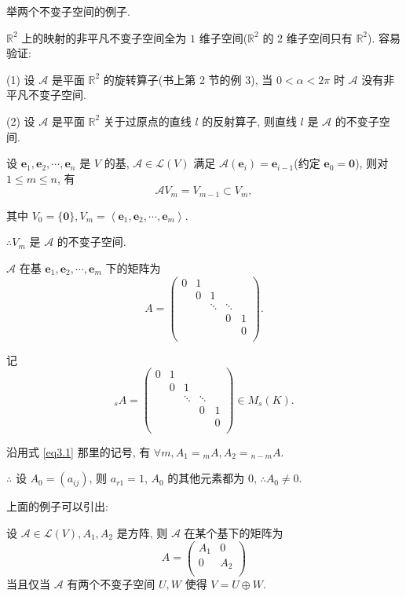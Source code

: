 \documentclass{ctexart}
\begin{document}
举两个不变子空间的例子.
\begin{example}
    $\mathbb{R}^2$ 上的映射的非平凡不变子空间全为 $1$ 维子空间($\mathbb{R}^2$ 的 $2$ 维子空间只有 $\mathbb{R}^2$). 容易验证:
    
    (1) 设 $\mathcal{A}$ 是平面 $\mathbb{R}^2$ 的旋转算子(书上第 2 节的例 3), 当 $0<\alpha<2\pi$ 时 $\mathcal{A}$ 没有非平凡不变子空间.

    (2) 设 $\mathcal{A}$ 是平面 $\mathbb{R}^2$ 关于过原点的直线 $l$ 的反射算子, 则直线 $l$ 是 $\mathcal{A}$ 的不变子空间.
\end{example}
\begin{example}\label{exa3.2}
    设 $\boldsymbol{e}_1,\boldsymbol{e}_2,\cdots,\boldsymbol{e}_n$ 是 $V$ 的基, $\mathcal{A}\in\mathcal{L}(V)$ 满足 $\mathcal{A}(\boldsymbol{e}_i)=\boldsymbol{e}_{i-1}$(约定 $\boldsymbol{e}_0=\boldsymbol{0}$), 则对 $1\leq m\leq n$, 有
    \[\mathcal{A}V_m=V_{m-1}\subset V_m,\]

    其中 $V_0=\{\boldsymbol{0}\},V_m=\left<\boldsymbol{e}_1,\boldsymbol{e}_2,\cdots,\boldsymbol{e}_m\right>$.

    $\therefore V_m$ 是 $\mathcal{A}$ 的不变子空间.

    $\mathcal{A}$ 在基 $\boldsymbol{e}_1,\boldsymbol{e}_2,\cdots,\boldsymbol{e}_m$ 下的矩阵为
    \[A=\begin{pmatrix}
        0 & 1 \\
        & 0 & 1 \\
        && \ddots & \ddots \\
        &&& 0 & 1 \\
        &&&& 0 \\
    \end{pmatrix}.\]

    记
    \[{}_{s}A=\begin{pmatrix}
        0 & 1 \\
        & 0 & 1 \\
        && \ddots & \ddots \\
        &&& 0 & 1 \\
        &&&& 0 \\
    \end{pmatrix}\in M_s(K).\]

    沿用式 \ref{eq3.1} 那里的记号, 有 $\forall m,A_1={}_{m}A,A_2={}_{n-m}A$.

    $\therefore$ 设 $A_0=(a_{ij})$, 则 $a_{r1}=1$, $A_0$ 的其他元素都为 $0$, $\therefore A_0\neq0$.
\end{example}
上面的例子可以引出:
\begin{theorem}[书上的定理 2]
    设 $\mathcal{A}\in\mathcal{L}(V),A_1,A_2$ 是方阵, 则 $\mathcal{A}$ 在某个基下的矩阵为
    \[A=\begin{pmatrix}
        A_1 & 0 \\
        0 & A_2 \\
    \end{pmatrix}\]
    当且仅当 $\mathcal{A}$ 有两个不变子空间 $U,W$ 使得 $V=U\oplus W$.
\end{theorem}
\end{document}

